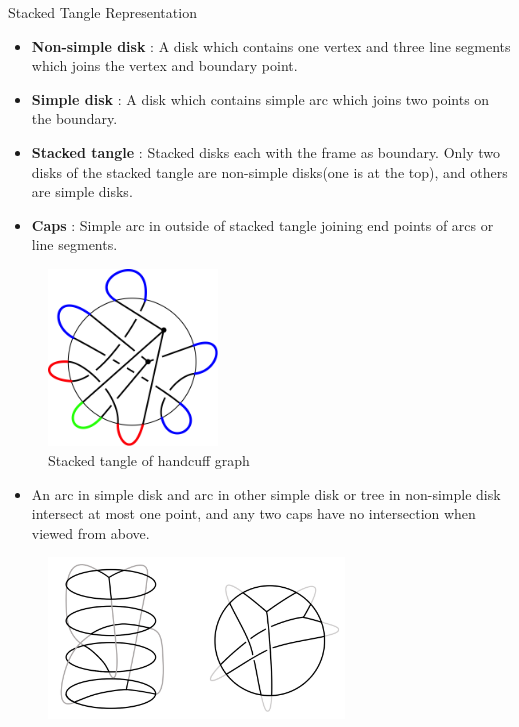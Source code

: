 \documentclass[final]{beamer}
\begin{document}
\begin{frame}[t]
\begin{columns}[t]
  
  \begin{block}{Stacked Tangle Representation}
    \begin{itemize}
      \item \textbf{Non-simple disk} : A disk which contains one vertex and three line segments which joins the vertex and boundary point. 
      \item \textbf{Simple disk} : A disk which contains simple arc which joins two points on the boundary.
      \item \textbf{Stacked tangle} : Stacked disks each with the frame as boundary. Only two disks of the stacked tangle are non-simple disks(one is at the top), and others are simple disks. \\
      \item \textbf{Caps} : Simple arc in outside of stacked tangle joining end points of arcs or line segments. \\
    \end{itemize}
    \begin{figure}
      \centering
      \includegraphics[width=0.4\textwidth]{figure/stacked_theta.png}
      \caption{Stacked tangle of handcuff graph}
    \end{figure}
    \begin{itemize}
      \item An arc in simple disk and arc in other simple disk or tree in non-simple disk intersect at most one point, and any two caps have no intersection when viewed from above.
    \end{itemize}
    \begin{figure}
      \centering
      \includegraphics[width=0.7\textwidth]{figure/stacked_tangle.png}

\end{figure}
\end{block}
\end{columns}
\end{frame}
\end{document}
